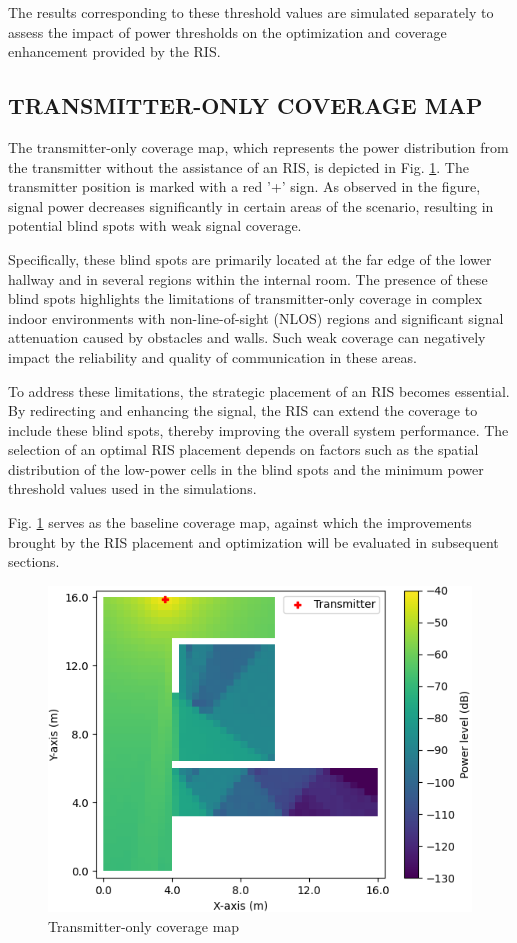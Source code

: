 \documentclass{IEEEoj}
\begin{document}
The results corresponding to these threshold values are simulated separately to assess the impact of power thresholds on the optimization and coverage enhancement provided by the RIS.

\subsection{TRANSMITTER-ONLY COVERAGE MAP}
The transmitter-only coverage map, which represents the power distribution from the transmitter without the assistance of an RIS, is depicted in Fig. \ref{TX_coverage_map}. The transmitter position is marked with a red '+' sign. As observed in the figure, signal power decreases significantly in certain areas of the scenario, resulting in potential blind spots with weak signal coverage.

Specifically, these blind spots are primarily located at the far edge of the lower hallway and in several regions within the internal room. The presence of these blind spots highlights the limitations of transmitter-only coverage in complex indoor environments with non-line-of-sight (NLOS) regions and significant signal attenuation caused by obstacles and walls. Such weak coverage can negatively impact the reliability and quality of communication in these areas.

To address these limitations, the strategic placement of an RIS becomes essential. By redirecting and enhancing the signal, the RIS can extend the coverage to include these blind spots, thereby improving the overall system performance. The selection of an optimal RIS placement depends on factors such as the spatial distribution of the low-power cells in the blind spots and the minimum power threshold values used in the simulations.

Fig. \ref{TX_coverage_map} serves as the baseline coverage map, against which the improvements brought by the RIS placement and optimization will be evaluated in subsequent sections.

\begin{figure}
	\centering \includegraphics[width=.9\linewidth]{Sim_Results/TX_coverage_map.png}
	\caption{Transmitter-only coverage map}
	\label{TX_coverage_map}
\end{figure}
\end{document}
